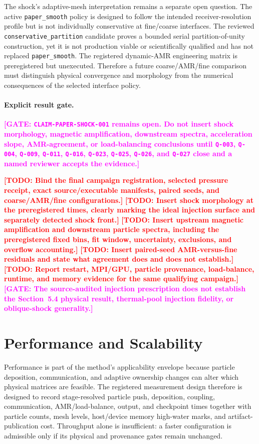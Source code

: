 \documentclass[twocolumn]{aastex701}
\newcommand{\TODO}[1]{\textcolor{red}{\textbf{[TODO: #1]}}}
\newcommand{\GATE}[1]{\textcolor{magenta}{\textbf{[GATE: #1]}}}
\newcommand{\claimid}[1]{\texttt{#1}}
\newcommand{\qgate}[1]{\texttt{#1}}
\begin{document}
The shock's adaptive-mesh interpretation remains a separate open question.
The active \texttt{paper\_smooth} policy is designed to follow the intended
receiver-resolution profile but is not individually conservative at
fine/coarse interfaces. The reviewed \texttt{conservative\_partition}
candidate proves a bounded serial partition-of-unity construction, yet it is
not production viable or scientifically qualified and has not replaced
\texttt{paper\_smooth}. The registered dynamic-AMR engineering matrix is
preregistered but unexecuted. Therefore a future coarse/AMR/fine comparison
must distinguish physical convergence and morphology from the numerical
consequences of the selected interface policy.

\paragraph{Explicit result gate.}
\GATE{\claimid{CLAIM-PAPER-SHOCK-001} remains open. Do not insert shock
morphology, magnetic amplification, downstream spectra, acceleration slope,
AMR-agreement, or load-balancing conclusions until \qgate{Q-003},
\qgate{Q-004}, \qgate{Q-009}, \qgate{Q-011}, \qgate{Q-016}, \qgate{Q-023},
\qgate{Q-025}, \qgate{Q-026}, and \qgate{Q-027} close and a named reviewer
accepts the evidence.}

\TODO{Bind the final campaign registration, selected pressure receipt, exact
source/executable manifests, paired seeds, and coarse/AMR/fine configurations.}
\TODO{Insert shock morphology at the preregistered times, clearly marking the
ideal injection surface and separately detected shock front.}
\TODO{Insert upstream magnetic amplification and downstream particle spectra,
including the preregistered fixed bins, fit window, uncertainty, exclusions,
and overflow accounting.}
\TODO{Insert paired-seed AMR-versus-fine residuals and state what agreement does
and does not establish.}
\TODO{Report restart, MPI/GPU, particle provenance, load-balance, runtime, and
memory evidence for the same qualifying campaign.}
\GATE{The source-audited injection prescription does not establish the
Section~5.4 physical result, thermal-pool injection fidelity, or oblique-shock
generality.}

\section{Performance and Scalability}
\label{sec:performance}

Performance is part of the method's applicability envelope because particle
deposition, communication, and adaptive ownership changes can alter which
physical matrices are feasible. The registered measurement design therefore
is designed to record stage-resolved particle push, deposition, coupling,
communication, AMR/load-balance, output, and checkpoint times together with
particle counts, mesh levels, host/device memory high-water marks, and
artifact-publication cost. Throughput alone is insufficient: a faster
configuration is admissible only if its physical and provenance gates remain
unchanged.
\end{document}
